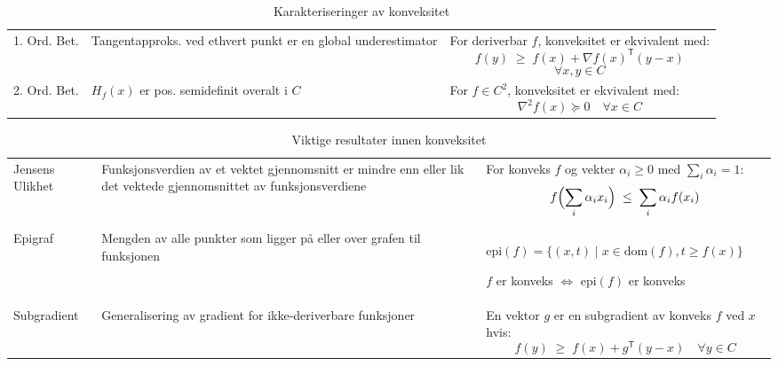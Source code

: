 \begin{table}[H]
  \centering
  \begin{tabular}{|p{3cm}|p{5cm}|p{6cm}|}
    \hline
    \rowcolor{rem-color!25}
    \multicolumn{3}{|l|}{\textbf{Karakteriseringer av Konveksitet}} \\
    \hline
    \rowcolor{rem-color!5}
    1. Ord. Bet. & Tangentapproks. ved ethvert punkt er en global underestimator &
    For deriverbar \(f\), konveksitet er ekvivalent med:
    \[f(y)\;\ge\; f(x) + \nabla f(x)^\mathsf{T} (y - x)\]
    \[\forall x,y \in C\] \\
    \hline
    2. Ord. Bet. & \(H_f(x)\) er pos. semidefinit overalt i \(C\) &
    For \(f \in C^2\), konveksitet er ekvivalent med:
    \[\nabla^2 f(x) \succeq 0\quad \forall x \in C\] \\
    \hline
  \end{tabular}
  \caption{Karakteriseringer av konveksitet}
  \label{tab:characterizations}
\end{table}

\begin{table}[H]
  \centering
  \begin{tabular}{|p{3cm}|p{5cm}|p{6cm}|}
    \hline
    \rowcolor{cor-color!25}
    \multicolumn{3}{|l|}{\textbf{Viktige Resultater}} \\
    \hline
    \rowcolor{cor-color!5}
    Jensens Ulikhet & Funksjonsverdien av et vektet gjennomsnitt er mindre enn \newline
    eller lik det vektede gjennomsnittet av funksjonsverdiene &
    For konveks \(f\) og vekter \(\alpha_i \geq 0\) med \(\sum_i \alpha_i = 1\):
    \[f\Bigl(\sum_i \alpha_i x_i\Bigr)\;\le\;\sum_i \alpha_i f(x_i)\] \\
    \hline
    Epigraf & Mengden av alle punkter som ligger på eller over grafen til funksjonen &
    \(\mathrm{epi}(f)=\{(x,t) \mid x\in\mathrm{dom}(f), t\ge f(x)\}\)
    
    \(f\) er konveks \(\Leftrightarrow\) \(\mathrm{epi}(f)\) er konveks \\
    \hline
    \rowcolor{cor-color!5}
    Subgradient & Generalisering av gradient for ikke-deriverbare funksjoner &
    En vektor \(g\) er en subgradient av konveks \(f\) ved \(x\) hvis:
    \[f(y)\;\ge\; f(x) + g^\mathsf{T}(y-x)\quad \forall y \in C\] \\
    \hline
  \end{tabular}
  \caption{Viktige resultater innen konveksitet}
  \label{tab:important_results}
\end{table}

